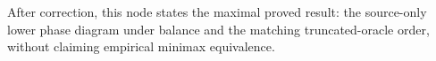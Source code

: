 After correction, this node states the maximal proved result: the source-only lower phase diagram under balance and the matching truncated-oracle order, without claiming empirical minimax equivalence.